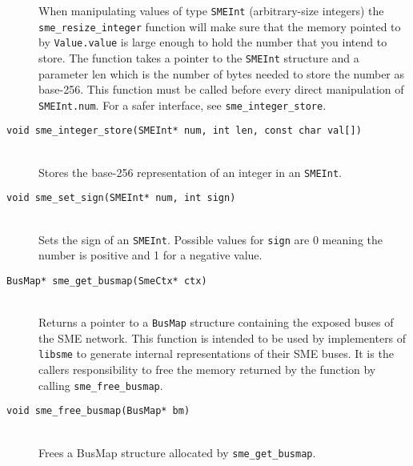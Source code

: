\begin{description}
   When manipulating values of type {\tt SMEInt} (arbitrary-size integers) the
   \texttt{sme_resize_integer} function will make sure that the memory pointed
   to by {\tt Value.value} is large enough to hold the number that you intend to
   store. The function takes a pointer to the {\tt SMEInt} structure and a
   parameter len which is the number of bytes needed to store the number as
   base-256. This function must be called before every direct manipulation of
   {\tt SMEInt.num}. For a safer interface, see \texttt{sme_integer_store}.
 \item[\texttt{void sme_integer_store(SMEInt* num, int len, const char val[])}]\hfill\\
   Stores the base-256 representation of an integer in an \texttt{SMEInt}.
 \item[\texttt{void sme_set_sign(SMEInt* num, int sign)}]\hfill\\
   Sets the sign of an \texttt{SMEInt}. Possible values for \texttt{sign} are 0
   meaning the number is positive and 1 for a negative value.
 \item[\texttt{BusMap* sme_get_busmap(SmeCtx* ctx)}]\hfill\\
   Returns a pointer to a {\tt BusMap} structure containing the exposed buses of
   the SME network. This function is intended to be used by implementers of {\tt
     libsme} to generate internal representations of their SME buses. It is the
   callers responsibility to free the memory returned by the function by calling
   \texttt{sme_free_busmap}.
\item[\texttt{void sme_free_busmap(BusMap* bm)}]\hfill\\
   Frees a BusMap structure allocated by \texttt{sme_get_busmap}.
\end{description}

